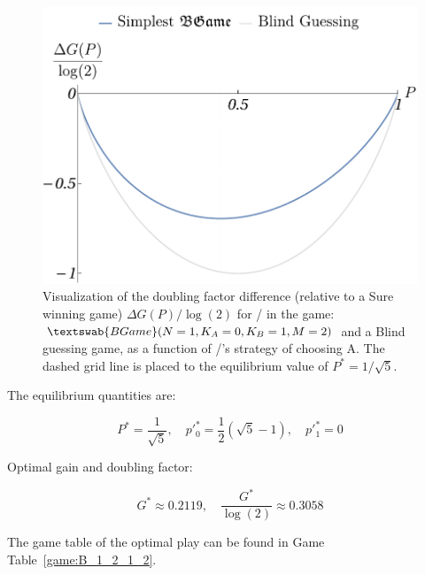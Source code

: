 \documentclass{article}
\theoremstyle{definition}
\newcommand{\BG}[1]{$\textswab{BGame}(#1)$}
\begin{document}
\begin{figure}[H]
    \centering
    \includegraphics[scale=0.7]{img/G_BG_1_0_1_2.pdf}
    \caption{Visualization of the doubling factor difference (relative to a Sure winning game) $\Delta G(P)/\log(2)$ for \PI/ in the game: \BG{N=1,K_A=0,K_B=1,M=2} and a Blind guessing game, as a function of \PII/'s strategy of choosing A. The dashed grid line is placed to the equilibrium value of $P^*=1/\sqrt{5}$.}
    \label{fig:GainPlot1012}
\end{figure}

The equilibrium quantities are:

\begin{equation}
    P^* = \frac{1}{\sqrt{5}}, \quad p'^*_0 = \frac{1}{2} \left ( \sqrt{5} -1 \right ), \quad p'^*_1 = 0 
\end{equation}

Optimal gain and doubling factor:

\begin{equation}
    G^* \approx 0.2119, \quad \frac{G^*}{\log(2)} \approx 0.3058
\end{equation}

The game table of the optimal play can be found in Game Table~\ref{game:B_1_2_1_2}.
\end{document}
